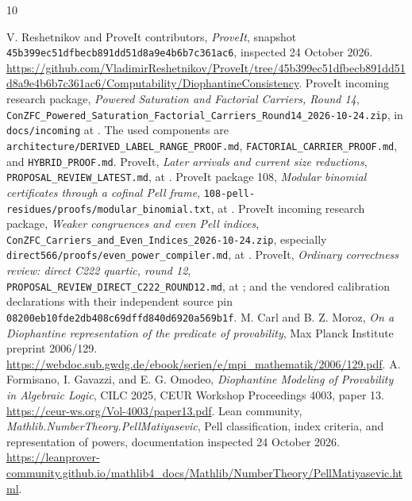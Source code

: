 \documentclass[11pt,letterpaper]{article}
\theoremstyle{remark}\newtheorem{remark}[theorem]{Remark}
\newcommand{\sha}{\texttt{45b399ec51dfbecb891dd51d8a9e4b6b7c361ac6}}
\begin{document}
\begin{thebibliography}{10}\raggedright
{} V. Reshetnikov and ProveIt contributors,
\emph{ProveIt}, snapshot \sha, inspected 24 October 2026.
\url{https://github.com/VladimirReshetnikov/ProveIt/tree/45b399ec51dfbecb891dd51d8a9e4b6b7c361ac6/Computability/DiophantineConsistency}.
 ProveIt incoming research package,
\emph{Powered Saturation and Factorial Carriers, Round 14},
\texttt{ConZFC\_Powered\_Saturation\_Factorial\_Carriers\_Round14\_2026-10-24.zip},
in \texttt{docs/incoming} at \cite{repo}. The used components are
\texttt{architecture/DERIVED\_LABEL\_RANGE\_PROOF.md},
\texttt{FACTORIAL\_CARRIER\_PROOF.md}, and \texttt{HYBRID\_PROOF.md}.
 ProveIt, \emph{Later arrivals and current size reductions},
\texttt{PROPOSAL\_REVIEW\_LATEST.md}, at \cite{repo}.
 ProveIt package 108,
\emph{Modular binomial certificates through a cofinal Pell frame},
\texttt{108-pell-residues/proofs/modular\_binomial.txt}, at \cite{repo}.
 ProveIt incoming research package,
\emph{Weaker congruences and even Pell indices},
\texttt{ConZFC\_Carriers\_and\_Even\_Indices\_2026-10-24.zip},
especially \texttt{direct566/proofs/even\_power\_compiler.md}, at \cite{repo}.
 ProveIt, \emph{Ordinary correctness review: direct C222 quartic, round 12},
\texttt{PROPOSAL\_REVIEW\_DIRECT\_C222\_ROUND12.md}, at \cite{repo};
and the vendored calibration declarations with their independent source
pin \texttt{08200eb10fde2db408c69dffd840d6920a569b1f}.
 M. Carl and B. Z. Moroz,
\emph{On a Diophantine representation of the predicate of provability},
Max Planck Institute preprint 2006/129.
\url{https://webdoc.sub.gwdg.de/ebook/serien/e/mpi_mathematik/2006/129.pdf}.
 A. Formisano, I. Gavazzi, and E. G. Omodeo,
\emph{Diophantine Modeling of Provability in Algebraic Logic},
CILC 2025, CEUR Workshop Proceedings 4003, paper 13.
\url{https://ceur-ws.org/Vol-4003/paper13.pdf}.
 Lean community, \emph{Mathlib.NumberTheory.PellMatiyasevic},
Pell classification, index criteria, and representation of powers,
documentation inspected 24 October 2026.
\url{https://leanprover-community.github.io/mathlib4_docs/Mathlib/NumberTheory/PellMatiyasevic.html}.
\end{thebibliography}
\end{document}
